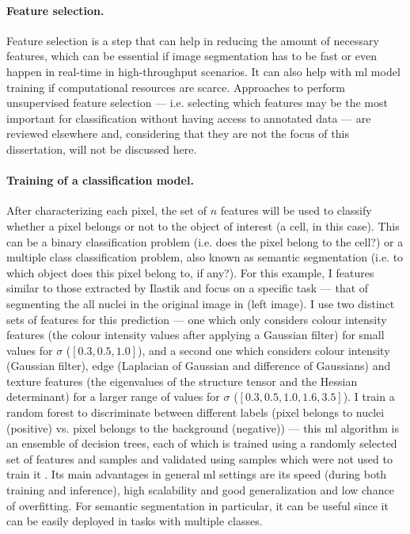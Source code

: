 \begin{figure}[!ht]
	\label{fig:segmentation-example-texture}
\end{figure}

\paragraph{Feature selection.} Feature selection is a step that can help in reducing the amount of necessary features, which can be essential if image segmentation has to be fast or even happen in real-time in high-throughput scenarios. It can also help with \ac{ml} model training if computational resources are scarce. Approaches to perform unsupervised feature selection --- i.e. selecting which features may be the most important for classification without having access to annotated data --- are reviewed elsewhere \cite{Solorio-Fernandez2020-cx} and, considering that they are not the focus of this dissertation, will not be discussed here. 
	
\paragraph{Training of a classification model.} After characterizing each pixel, the set of $n$ features will be used to classify whether a pixel belongs or not to the object of interest (a cell, in this case). This can be a binary classification problem (i.e. does the pixel belong to the cell?) or a multiple class classification problem, also known as semantic segmentation (i.e. to which object does this pixel belong to, if any?). For this example, I features similar to those extracted by Ilastik \cite{Sommer2011-ds} and focus on a specific task --- that of segmenting the all nuclei in the original image in  (left image). I use two distinct sets of features for this prediction --- one which only considers colour intensity features (the colour intensity values after applying a Gaussian filter) for small values for $\sigma$ ($[0.3,0.5,1.0]$), and a second one which considers colour intensity (Gaussian filter), edge (Laplacian of Gaussian and difference of Gaussians) and texture features (the eigenvalues of the structure tensor and the Hessian determinant) for a larger range of values for $\sigma$ ($[0.3,0.5,1.0,1.6,3.5]$). I train a random forest to discriminate between different labels (pixel belongs to nuclei (positive) vs. pixel belongs to the background (negative)) --- this \ac{ml} algorithm is an ensemble of decision trees, each of which is trained using a randomly selected set of features and samples and validated using samples which were not used to train it \cite{Breiman2001-yz}. Its main advantages in general \ac{ml} settings are its speed (during both training and inference), high scalability and good generalization and low chance of overfitting. For semantic segmentation in particular, it can be useful since it can be easily deployed in tasks with multiple classes.

